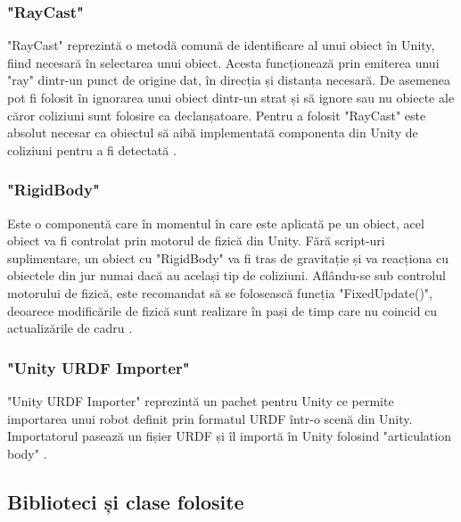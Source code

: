 \subsubsection{"RayCast"}
 "RayCast" reprezintă o metodă comună de identificare al unui obiect în Unity, fiind necesară în selectarea unui obiect. Acesta funcționează prin emiterea unui "ray" dintr-un punct de origine dat, în direcția și distanța necesară. De asemenea pot fi folosit în ignorarea unui obiect dintr-un strat și să ignore sau nu obiecte ale căror coliziuni sunt folosire ca declanșatoare. Pentru a folosit "RayCast" este absolut necesar ca obiectul să aibă implementată componenta din Unity de coliziuni pentru a fi detectată \cite{RayCast}.

\subsubsection{"RigidBody"} 
Este o componentă care în momentul în care este aplicată pe un obiect, acel obiect va fi controlat prin motorul de fizică din Unity. Fără script-uri suplimentare, un obiect cu "RigidBody" va fi tras de gravitație și va reacționa cu obiectele din jur numai dacă au același tip de coliziuni. Aflându-se sub controlul motorului de fizică, este recomandat să se folosească funcția "FixedUpdate()", deoarece modificările de fizică sunt realizare în pași de timp care nu coincid cu actualizările de cadru \cite{RB}.




\subsubsection{"Unity URDF Importer"}
"Unity URDF Importer" reprezintă un pachet pentru Unity ce permite importarea unui robot definit prin formatul URDF într-o scenă din Unity. Importatorul pasează un fișier URDF și îl importă în Unity folosind "articulation body" \cite{UU}.
\subsection{Biblioteci și clase folosite}
